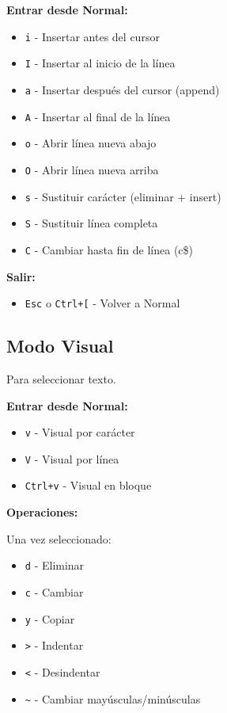 \documentclass[
  doc,
  floatsintext,
  longtable,
  a4paper,
  nolmodern,
  notxfonts,
  notimes,
  12pt,
  colorlinks=true,linkcolor=blue,citecolor=blue,urlcolor=blue]{apa7}
\providecommand{\tightlist}{%
  \setlength{\itemsep}{0pt}\setlength{\parskip}{0pt}}
\begin{document}
\textbf{Entrar desde Normal:}

\begin{itemize}
\tightlist
\item
  \texttt{i} - Insertar antes del cursor
\item
  \texttt{I} - Insertar al inicio de la línea
\item
  \texttt{a} - Insertar después del cursor (append)
\item
  \texttt{A} - Insertar al final de la línea
\item
  \texttt{o} - Abrir línea nueva abajo
\item
  \texttt{O} - Abrir línea nueva arriba
\item
  \texttt{s} - Sustituir carácter (eliminar + insert)
\item
  \texttt{S} - Sustituir línea completa
\item
  \texttt{C} - Cambiar hasta fin de línea (c\$)
\end{itemize}

\textbf{Salir:}

\begin{itemize}
\tightlist
\item
  \texttt{Esc} o \texttt{Ctrl+{[}} - Volver a Normal
\end{itemize}

\subsection{Modo Visual}\label{modo-visual}

Para seleccionar texto.

\textbf{Entrar desde Normal:}

\begin{itemize}
\tightlist
\item
  \texttt{v} - Visual por carácter
\item
  \texttt{V} - Visual por línea
\item
  \texttt{Ctrl+v} - Visual en bloque
\end{itemize}

\textbf{Operaciones:}

Una vez seleccionado:

\begin{itemize}
\tightlist
\item
  \texttt{d} - Eliminar
\item
  \texttt{c} - Cambiar
\item
  \texttt{y} - Copiar
\item
  \texttt{\textgreater{}} - Indentar
\item
  \texttt{\textless{}} - Desindentar
\item
  \texttt{\textasciitilde{}} - Cambiar mayúsculas/minúsculas
\end{itemize}
\end{document}
